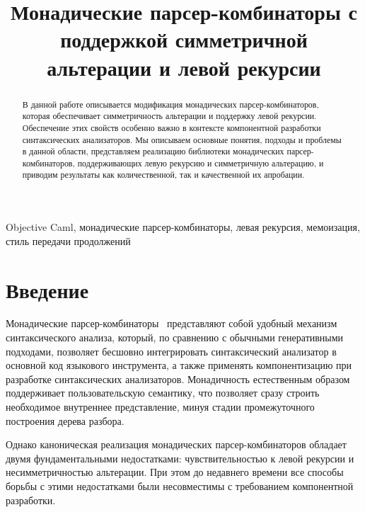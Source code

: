 \documentclass[conference]{IEEEtran}
\begin{document}
\title{Монадические парсер-комбинаторы с поддержкой симметричной альтерации и левой рекурсии}

\author{
}

\maketitle

\begin{abstract}
  В данной работе описывается модификация монадических парсер-комбинаторов, которая обеспечивает симметричность
  альтерации и поддержку левой рекурсии. Обеспечение этих свойств особенно важно в контексте компонентной разработки
  синтаксических анализаторов. Мы описываем основные понятия, подходы и проблемы в данной области,
  представляем реализацию библиотеки монадических парсер-комбинаторов, поддерживающих левую рекурсию и симметричную альтерацию,
  и приводим результаты как количественной, так и качественной их апробации.
\end{abstract}

\begin{IEEEkeywords}
Objective Caml, монадические парсер-комбинаторы, левая рекурсия, мемоизация, стиль передачи продолжений
\end{IEEEkeywords}

\section{Введение}

Монадические парсер-комбинаторы~\cite{meijer,wadler} представляют собой удобный механизм синтаксического анализа, который, по сравнению
с обычными генеративными подходами, позволяет бесшовно интегрировать синтаксический анализатор в основной код языкового инструмента, а
также применять компонентизацию при разработке синтаксических анализаторов. Монадичность естественным образом поддерживает пользовательскую
семантику, что позволяет сразу строить необходимое внутреннее представление, минуя стадии промежуточного построения дерева разбора.

Однако каноническая реализация монадических парсер-комбинаторов обладает двумя фундаментальными недостатками: чувствительностью
к левой рекурсии и несимметричностью альтерации. При этом до недавнего времени все способы борьбы с этими недостатками были
несовместимы с требованием компонентной разработки.
\end{document}
